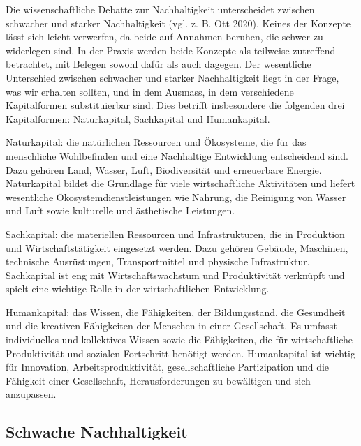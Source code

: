 \documentclass[
  nswissgerman,
  a4paper,
  DIV=11,
  numbers=noendperiod,
  oneside,
  openany]{scrreprt}
\begin{document}
Die wissenschaftliche Debatte zur Nachhaltigkeit unterscheidet zwischen
schwacher und starker Nachhaltigkeit (vgl. z. B. Ott 2020). Keines der
Konzepte lässt sich leicht verwerfen, da beide auf Annahmen beruhen, die
schwer zu widerlegen sind. In der Praxis werden beide Konzepte als
teilweise zutreffend betrachtet, mit Belegen sowohl dafür als auch
dagegen. Der wesentliche Unterschied zwischen schwacher und starker
Nachhaltigkeit liegt in der Frage, was wir erhalten sollten, und in dem
Ausmass, in dem verschiedene Kapitalformen substituierbar sind. Dies
betrifft insbesondere die folgenden drei Kapitalformen: Naturkapital,
Sachkapital und Humankapital.

Naturkapital: die natürlichen Ressourcen und Ökosysteme, die für das
menschliche Wohlbefinden und eine Nachhaltige Entwicklung entscheidend
sind. Dazu gehören Land, Wasser, Luft, Biodiversität und erneuerbare
Energie. Naturkapital bildet die Grundlage für viele wirtschaftliche
Aktivitäten und liefert wesentliche Ökosystemdienstleistungen wie
Nahrung, die Reinigung von Wasser und Luft sowie kulturelle und
ästhetische Leistungen.

Sachkapital: die materiellen Ressourcen und Infrastrukturen, die in
Produktion und Wirtschaftstätigkeit eingesetzt werden. Dazu gehören
Gebäude, Maschinen, technische Ausrüstungen, Transportmittel und
physische Infrastruktur. Sachkapital ist eng mit Wirtschaftswachstum und
Produktivität verknüpft und spielt eine wichtige Rolle in der
wirtschaftlichen Entwicklung.

Humankapital: das Wissen, die Fähigkeiten, der Bildungsstand, die
Gesundheit und die kreativen Fähigkeiten der Menschen in einer
Gesellschaft. Es umfasst individuelles und kollektives Wissen sowie die
Fähigkeiten, die für wirtschaftliche Produktivität und sozialen
Fortschritt benötigt werden. Humankapital ist wichtig für Innovation,
Arbeitsproduktivität, gesellschaftliche Partizipation und die Fähigkeit
einer Gesellschaft, Herausforderungen zu bewältigen und sich anzupassen.

\subsection{Schwache Nachhaltigkeit}\label{schwache-nachhaltigkeit}
\end{document}
